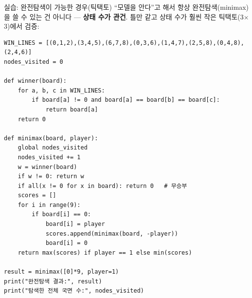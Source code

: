 \begin{frame}[fragile]{실습: 완전탐색이 가능한 경우(틱택토)}
  ``모델을 안다''고 해서 항상 완전탐색(minimax)을 쓸 수 있는 건
  아니다 --- \textbf{상태 수가 관건}. 틀만 같고 상태 수가 훨씬
  작은 틱택토(3$\times$3)에서 검증:
\begin{lstlisting}
WIN_LINES = [(0,1,2),(3,4,5),(6,7,8),(0,3,6),(1,4,7),(2,5,8),(0,4,8),(2,4,6)]
nodes_visited = 0

def winner(board):
    for a, b, c in WIN_LINES:
        if board[a] != 0 and board[a] == board[b] == board[c]:
            return board[a]
    return 0

def minimax(board, player):
    global nodes_visited
    nodes_visited += 1
    w = winner(board)
    if w != 0: return w
    if all(x != 0 for x in board): return 0   # 무승부
    scores = []
    for i in range(9):
        if board[i] == 0:
            board[i] = player
            scores.append(minimax(board, -player))
            board[i] = 0
    return max(scores) if player == 1 else min(scores)

result = minimax([0]*9, player=1)
print("완전탐색 결과:", result)
print("탐색한 전체 국면 수:", nodes_visited)
\end{lstlisting}
\end{frame}
